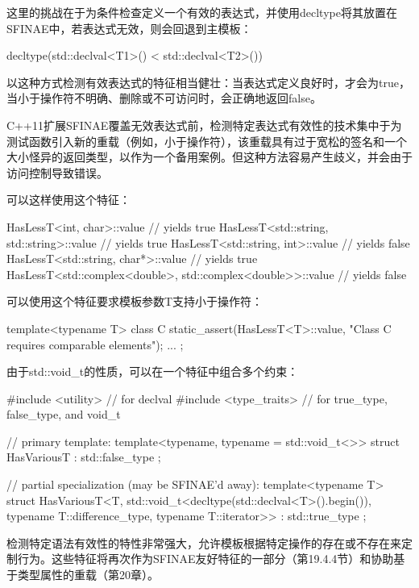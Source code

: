 这里的挑战在于为条件检查定义一个有效的表达式，并使用decltype将其放置在SFINAE中，若表达式无效，则会回退到主模板：

\begin{cpp}
decltype(std::declval<T1>() < std::declval<T2>())
\end{cpp}

以这种方式检测有效表达式的特征相当健壮：当表达式定义良好时，才会为true，当小于操作符不明确、删除或不可访问时，会正确地返回false。

\begin{notice}
C++11扩展SFINAE覆盖无效表达式前，检测特定表达式有效性的技术集中于为测试函数引入新的重载（例如，小于操作符），该重载具有过于宽松的签名和一个大小怪异的返回类型，以作为一个备用案例。但这种方法容易产生歧义，并会由于访问控制导致错误。
\end{notice}

可以这样使用这个特征：

\begin{cpp}
HasLessT<int, char>::value // yields true
HasLessT<std::string, std::string>::value // yields true
HasLessT<std::string, int>::value // yields false
HasLessT<std::string, char*>::value // yields true
HasLessT<std::complex<double>, std::complex<double>>::value // yields false
\end{cpp}

可以使用这个特征要求模板参数T支持小于操作符：

\begin{cpp}
template<typename T>
class C
{
	static_assert(HasLessT<T>::value,
				  "Class C requires comparable elements");
	...
};
\end{cpp}

由于std::void\_t的性质，可以在一个特征中组合多个约束：

\begin{cpp}
#include <utility> // for declval
#include <type_traits> // for true_type, false_type, and void_t

// primary template:
template<typename, typename = std::void_t<>>
struct HasVariousT : std::false_type
{
};

// partial specialization (may be SFINAE'd away):
template<typename T>
struct HasVariousT<T, std::void_t<decltype(std::declval<T>().begin()),
					typename T::difference_type,
					typename T::iterator>>
: std::true_type
{
};
\end{cpp}

检测特定语法有效性的特性非常强大，允许模板根据特定操作的存在或不存在来定制行为。这些特征将再次作为SFINAE友好特征的一部分（第19.4.4节）和协助基于类型属性的重载（第20章）。

